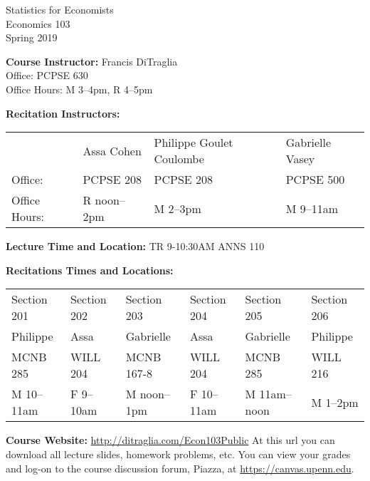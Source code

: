\documentclass[11pt, letterpaper]{article}
\begin{document}
\thispagestyle{plain}

\begin{center}
\Large
\sc
Statistics for Economists\\
\large
Economics 103\\
\large
Spring 2019
\end{center}



\normalsize

\noindent \textbf{Course Instructor:} Francis DiTraglia \\
Office: PCPSE 630\\
Office Hours: M 3--4pm, R 4--5pm

\medskip


\noindent \textbf{Recitation Instructors:}

\medskip
\noindent

\begin{tabular}{llll}
  & Assa Cohen & Philippe Goulet Coulombe & Gabrielle Vasey\\
Office:& PCPSE 208& PCPSE 208 & PCPSE 500 \\ 
Office Hours:& R noon--2pm & M 2--3pm & M 9--11am   
\end{tabular}

\medskip
 
\noindent \textbf{Lecture Time and Location:} TR 9-10:30AM ANNS 110 

\medskip

\noindent \textbf{Recitations Times and Locations:}
\medskip \noindent

\begin{tabular}{llllll}
	Section 201 & Section 202 & Section 203 & Section 204 & Section 205 & Section 206\\ 
  Philippe & Assa & Gabrielle & Assa & Gabrielle & Philippe \\
	MCNB 285 & WILL 204 & MCNB 167-8 & WILL 204 & MCNB 285 & WILL 216 \\ 
  M 10--11am & F 9--10am & M noon--1pm & F 10--11am & M 11am--noon & M 1--2pm
\end{tabular}


\medskip

\medskip
 
\noindent \textbf{Course Website:} \url{http://ditraglia.com/Econ103Public} At this url you can download all lecture slides, homework problems, etc.
You can view your grades and log-on to the course discussion forum, Piazza, at \url{https://canvas.upenn.edu}.

\medskip
\end{document}
